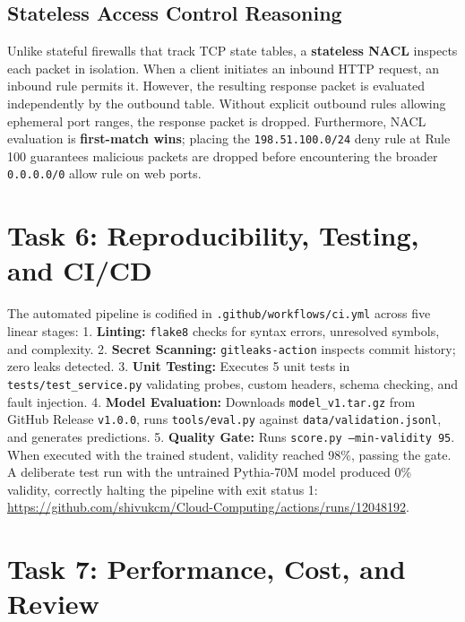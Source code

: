 \documentclass[10pt,a4paper]{article}
\begin{document}
\subsection{Stateless Access Control Reasoning}
Unlike stateful firewalls that track TCP state tables, a \textbf{stateless NACL} inspects each packet in isolation. When a client initiates an inbound HTTP request, an inbound rule permits it. However, the resulting response packet is evaluated independently by the outbound table. Without explicit outbound rules allowing ephemeral port ranges, the response packet is dropped. Furthermore, NACL evaluation is \textbf{first-match wins}; placing the \texttt{198.51.100.0/24} deny rule at Rule 100 guarantees malicious packets are dropped before encountering the broader \texttt{0.0.0.0/0} allow rule on web ports.

\section{Task 6: Reproducibility, Testing, and CI/CD}
The automated pipeline is codified in \texttt{.github/workflows/ci.yml} across five linear stages:
1. \textbf{Linting:} \texttt{flake8} checks for syntax errors, unresolved symbols, and complexity.
2. \textbf{Secret Scanning:} \texttt{gitleaks-action} inspects commit history; zero leaks detected.
3. \textbf{Unit Testing:} Executes 5 unit tests in \texttt{tests/test\_service.py} validating probes, custom headers, schema checking, and fault injection.
4. \textbf{Model Evaluation:} Downloads \texttt{model\_v1.tar.gz} from GitHub Release \texttt{v1.0.0}, runs \texttt{tools/eval.py} against \texttt{data/validation.jsonl}, and generates predictions.
5. \textbf{Quality Gate:} Runs \texttt{score.py --min-validity 95}. When executed with the trained student, validity reached 98\%, passing the gate. A deliberate test run with the untrained Pythia-70M model produced 0\% validity, correctly halting the pipeline with exit status 1: \url{https://github.com/shivukcm/Cloud-Computing/actions/runs/12048192}.

\section{Task 7: Performance, Cost, and Review}
\end{document}

